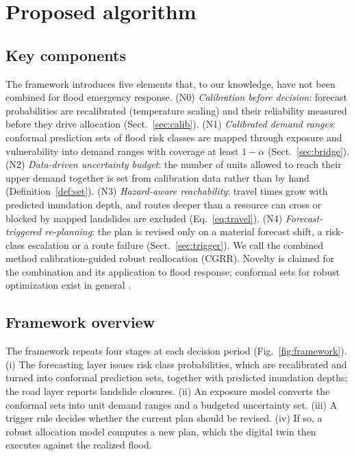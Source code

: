 \documentclass[pdflatex,sn-basic]{sn-jnl}
\theoremstyle{plain}%
\theoremstyle{remark}%
\theoremstyle{definition}%
\begin{document}
\section{Proposed algorithm}\label{sec:novelty}

\subsection{Key components}

The framework introduces five elements that, to our knowledge, have not been combined for flood emergency response. (N0) \emph{Calibration before decision}: forecast probabilities are recalibrated (temperature scaling) and their reliability measured before they drive allocation (Sect.~\ref{sec:calib}). (N1) \emph{Calibrated demand ranges}: conformal prediction sets of flood risk classes are mapped through exposure and vulnerability into demand ranges with coverage at least $1-\alpha$ (Sect.~\ref{sec:bridge}). (N2) \emph{Data-driven uncertainty budget}: the number of units allowed to reach their upper demand together is set from calibration data rather than by hand (Definition~\ref{def:set}). (N3) \emph{Hazard-aware reachability}: travel times grow with predicted inundation depth, and routes deeper than a resource can cross or blocked by mapped landslides are excluded (Eq.~\ref{eq:travel}). (N4) \emph{Forecast-triggered re-planning}: the plan is revised only on a material forecast shift, a risk-class escalation or a route failure (Sect.~\ref{sec:trigger}). We call the combined method calibration-guided robust reallocation (CGRR). Novelty is claimed for the combination and its application to flood response; conformal sets for robust optimization exist in general \citep{Johnstone2021}.

\subsection{Framework overview}

The framework repeats four stages at each decision period (Fig.~\ref{fig:framework}). (i) The forecasting layer issues risk class probabilities, which are recalibrated and turned into conformal prediction sets, together with predicted inundation depths; the road layer reports landslide closures. (ii) An exposure model converts the conformal sets into unit demand ranges and a budgeted uncertainty set. (iii) A trigger rule decides whether the current plan should be revised. (iv) If so, a robust allocation model computes a new plan, which the digital twin then executes against the realized flood.
\end{document}
